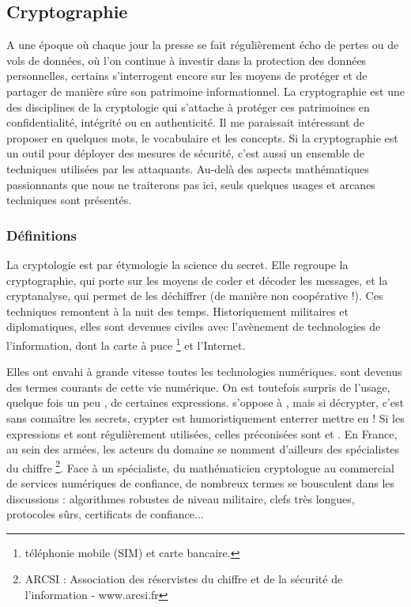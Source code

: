 \subsection{Cryptographie}
A une époque où chaque jour la presse se fait régulièrement écho de pertes ou de vols de données, où l'on continue à investir dans la  protection des données personnelles, certains s'interrogent encore sur les moyens de protéger et de partager de manière sûre son patrimoine informationnel. La cryptographie est une des disciplines de la cryptologie qui s'attache à protéger ces patrimoines en confidentialité, intégrité ou en authenticité. Il me paraissait intéressant de proposer en quelques mots, le vocabulaire et les concepts. Si la cryptographie est un outil pour déployer des mesures de sécurité, c'est aussi un ensemble de techniques utilisées par les attaquants.  Au-delà des aspects mathématiques passionnants que nous ne traiterons pas ici,  seuls quelques usages et arcanes techniques sont présentés.

\subsubsection{Définitions}

La cryptologie est par étymologie la science du secret. Elle regroupe la cryptographie, qui porte sur les moyens de coder et décoder les messages, et la cryptanalyse, qui permet de les déchiffrer (de manière non coopérative !).
Ces techniques remontent à la nuit des temps. Historiquement militaires et diplomatiques, elles sont devenues civiles avec l'avènement de technologies de l'information, dont la carte à puce \footnote{téléphonie mobile (SIM) et carte bancaire.} et l'Internet.

Elles ont envahi à grande vitesse toutes les technologies numériques.  sont devenus des termes courants de cette vie numérique. On est toutefois surpris de l'usage, quelque fois un peu , de certaines expressions.  s'oppose à , mais si décrypter, c'est  sans connaître les secrets, crypter est humoristiquement enterrer  mettre en ! Si les expressions  et  sont régulièrement utilisées, celles préconisées sont  et . En France, au sein des armées, les acteurs du domaine se nomment d'ailleurs des spécialistes du chiffre \footnote{ARCSI : Association des réservistes du chiffre et de la sécurité de l'information - www.arcsi.fr}. Face à un spécialiste, du mathématicien cryptologue au commercial de services numériques de confiance, de nombreux termes se bousculent dans les discussions : algorithmes robustes de niveau militaire, clefs très longues, protocoles sûrs, certificats de confiance...

